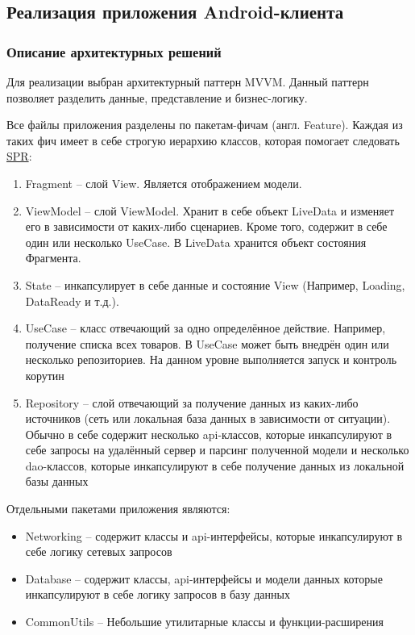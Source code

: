 \subsection{Реализация приложения Android-клиента}\label{subsec:3-impl-android}\indent

\subsubsection{Описание архитектурных решений}\indent

Для реализации выбран архитектурный паттерн MVVM. Данный паттерн позволяет разделить данные, представление и бизнес-логику.

Все файлы приложения разделены по пакетам-фичам (англ. Feature).
Каждая из таких фич имеет в себе строгую иерархию классов, которая помогает следовать \hyperlink{gloss:spr}{SPR}:
\begin{enumerate}
    \item Fragment – слой View.
    Является отображением модели.
    \item ViewModel – слой ViewModel.
    Хранит в себе объект LiveData и изменяет его в зависимости от каких-либо сценариев.
    Кроме того, содержит в себе один или несколько UseCase.
    В LiveData хранится объект состояния Фрагмента.
    \item State – инкапсулирует в себе данные и состояние View (Например, Loading, DataReady и т.д.).
    \item UseCase – класс отвечающий за одно определённое действие.
    Например, получение списка всех товаров.
    В UseCase может быть внедрён один или несколько репозиториев.
    На данном уровне выполняется запуск и контроль корутин
    \item Repository – слой отвечающий за получение данных из каких-либо источников (сеть или локальная база данных в зависимости от ситуации).
    Обычно в себе содержит несколько api-классов, которые инкапсулируют в себе запросы на удалённый сервер и парсинг полученной модели и несколько dao-классов, которые инкапсулируют в себе получение данных из локальной базы данных
\end{enumerate}

Отдельными пакетами приложения являются:
\begin{itemize}
    \item Networking – содержит классы и api-интерфейсы, которые инкапсулируют в себе логику сетевых запросов
    \item Database – содержит классы, api-интерфейсы и модели данных которые инкапсулируют в себе логику запросов в базу данных
    \item CommonUtils – Небольшие утилитарные классы и функции-расширения
\end{itemize}

